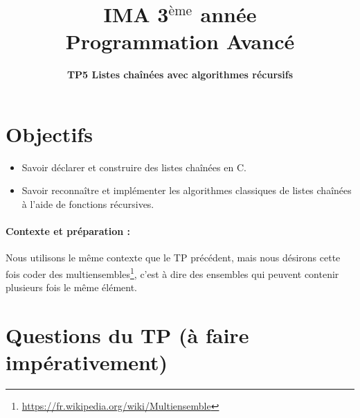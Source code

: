 \documentclass[final, pdftex, a4paper, openbib, ]{article}
\title{IMA 3$^{\mbox{\`eme}}$ année\\ Programmation Avancé
}
\author{\huge \textbf{TP5 Listes chaînées avec algorithmes récursifs}}
\date{}
\begin{document}
\posttitle{\par\end{center}}
\setlength{\droptitle}{-45pt}
\maketitle

\vspace{-1.7cm}
\section{Objectifs}

\begin{itemize}
	\item Savoir déclarer et construire des listes chaînées en C.
	\item Savoir reconnaître et implémenter les algorithmes classiques de listes chaînées à l'aide de fonctions récursives.
\end{itemize}


\paragraph{Contexte et préparation : } Nous utilisons le même contexte que le TP précédent, mais nous désirons cette fois coder des multiensembles\footnote{\url{https://fr.wikipedia.org/wiki/Multiensemble}}, c'est à dire des ensembles qui peuvent contenir plusieurs fois le même élément.



\section{Questions du TP \large (à faire impérativement)}
\end{document}
